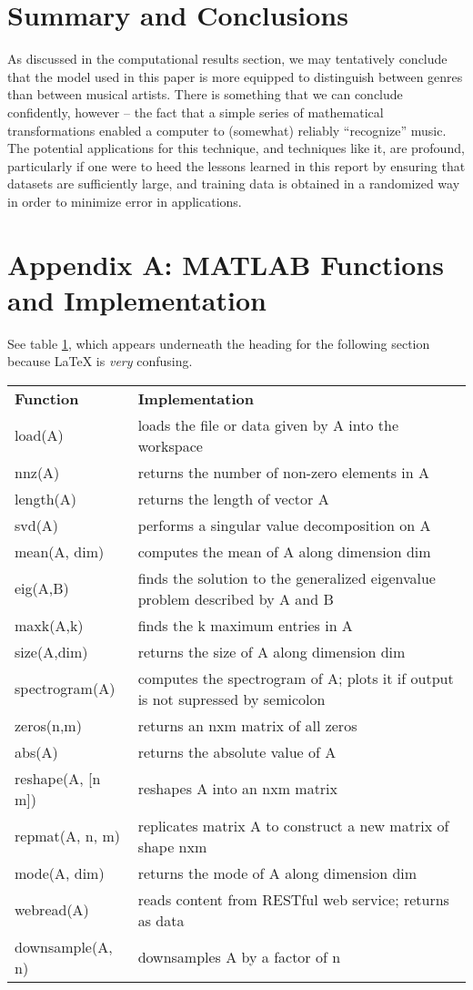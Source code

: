 \documentclass[a4paper,10 pt]{article}
\begin{document}
\section{Summary and Conclusions}
As discussed in the computational results section, we may tentatively conclude that the model used in this paper is more equipped to distinguish between genres than between musical artists. There is something that we can conclude confidently, however -- the fact that a simple series of mathematical transformations enabled a computer to (somewhat) reliably ``recognize'' music. The potential applications for this technique, and techniques like it, are profound, particularly if one were to heed the lessons learned in this report by ensuring that datasets are sufficiently large, and training data is obtained in a randomized way in order to minimize error in applications. 
\section{Appendix A: MATLAB Functions and Implementation}
See table \ref{tab:functions}, which appears underneath the heading for the following section because LaTeX is \emph{very} confusing.
\begin{table}[]
\begin{tabular}{ll}
\textbf{Function} & \textbf{Implementation} \\
load(A) & loads the file or data given by A into the workspace \\
nnz(A) & returns the number of non-zero elements in A \\
length(A) & returns the length of vector A \\
svd(A) & performs a singular value decomposition on A \\
mean(A, dim) & computes the mean of A along dimension dim \\
eig(A,B) & finds the solution to the generalized eigenvalue problem described by A and B \\
maxk(A,k) & finds the k maximum entries in A \\
size(A,dim) & returns the size of A along dimension dim \\
spectrogram(A) & computes the spectrogram of A; plots it if output is not supressed by semicolon \\
zeros(n,m) & returns an nxm matrix of all zeros \\
abs(A) & returns the absolute value of A \\
reshape(A, {[}n m{]}) & reshapes A into an nxm matrix \\
repmat(A, n, m) & replicates matrix A to construct a new matrix of shape nxm \\
mode(A, dim) & returns the mode of A along dimension dim \\
webread(A) & reads content from RESTful web service; returns as data \\
downsample(A, n) & downsamples A by a factor of n
\end{tabular}
\label{tab:functions}
\end{table}
\end{document}

